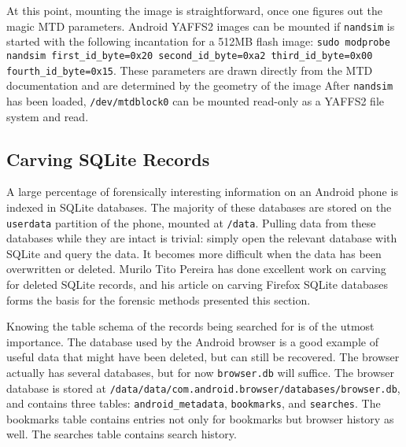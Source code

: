 At this point, mounting the image is straightforward, once one figures out the magic MTD parameters.
Android YAFFS2 images can be mounted if \texttt{nandsim} is started with the following incantation for a 512MB flash image:
\texttt{sudo modprobe nandsim first\_id\_byte=0x20 second\_id\_byte=0xa2 third\_id\_byte=0x00 fourth\_id\_byte=0x15}.
These parameters are drawn directly from the MTD documentation and are determined by the geometry of the image \cite{mtdfaq}
After \texttt{nandsim} has been loaded, \texttt{/dev/mtdblock0} can be mounted read-only as a YAFFS2 file system and read.

\subsection{Carving SQLite Records} A large percentage of forensically interesting information on an Android phone is indexed in
SQLite databases.  The majority of these databases are stored on the \texttt{userdata} partition of the phone, mounted at
\texttt{/data}.  Pulling data from these databases while they are intact is trivial: simply open the relevant database with SQLite
and query the data.  It becomes more difficult when the data has been overwritten or deleted.  Murilo Tito Pereira has done
excellent work on carving for deleted SQLite records, and his article on carving Firefox SQLite databases forms the basis for the
forensic methods presented this section.  \cite{carvefirefox}

Knowing the table schema of the records being searched for is of the utmost importance.  The database used by the Android browser is
a good example of useful data that might have been deleted, but can still be recovered.  The browser actually has several databases,
but for now \texttt{browser.db} will suffice. The browser database is stored at
\texttt{/data/data/com.android.browser/databases/browser.db}, and contains three tables: \texttt{android\_metadata},
\texttt{bookmarks}, and \texttt{searches}.  The bookmarks table contains entries not only for bookmarks but browser history as well.
The searches table contains search history. 

